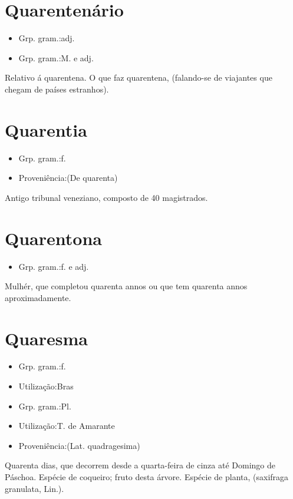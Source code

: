 \section{Quarentenário}
\begin{itemize}
\item {Grp. gram.:adj.}
\end{itemize}
\begin{itemize}
\item {Grp. gram.:M.  e  adj.}
\end{itemize}
Relativo á quarentena.
O que faz quarentena, (falando-se de viajantes que chegam de países estranhos).
\section{Quarentia}
\begin{itemize}
\item {Grp. gram.:f.}
\end{itemize}
\begin{itemize}
\item {Proveniência:(De \textunderscore quarenta\textunderscore )}
\end{itemize}
Antigo tribunal veneziano, composto de 40 magistrados.
\section{Quarentona}
\begin{itemize}
\item {Grp. gram.:f.  e  adj.}
\end{itemize}
Mulhér, que completou quarenta annos ou que tem quarenta annos aproximadamente.
\section{Quaresma}
\begin{itemize}
\item {Grp. gram.:f.}
\end{itemize}
\begin{itemize}
\item {Utilização:Bras}
\end{itemize}
\begin{itemize}
\item {Grp. gram.:Pl.}
\end{itemize}
\begin{itemize}
\item {Utilização:T. de Amarante}
\end{itemize}
\begin{itemize}
\item {Proveniência:(Lat. \textunderscore quadragesima\textunderscore )}
\end{itemize}
Quarenta dias, que decorrem desde a quarta-feira de cinza até Domingo de Páschoa.
Espécie de coqueiro; fruto desta árvore.
Espécie de planta, (\textunderscore saxifraga granulata\textunderscore , Lin.).
